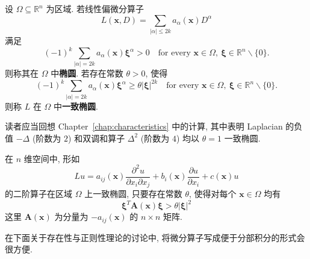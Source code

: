 \begin{Definition}
\label{def:positive-sign-elliptic-and-uniform-elliptic}
设 $\Omega\subseteq\mathbb{R}^n$ 为区域. 若线性偏微分算子
\begin{equation}\label{eq:even-order-elliptic-differential-operator}
L(\bm{x},D)=\sum_{|\alpha|\leq2k}a_\alpha(\bm{x})D^\alpha
\end{equation}
满足
\begin{equation}\label{eq:positive-sign-ellipticity-condition}
(-1)^k\sum_{|\alpha|=2k}a_\alpha(\bm{x})\bm{\xi}^\alpha>0\quad\text{for every }\bm{x}\in\Omega,\ \bm{\xi}\in\mathbb{R}^n\backslash\{0\}.
\end{equation}
则称其在 $\Omega$ 中\textbf{椭圆}. 若存在常数 $\theta>0$, 使得
\begin{equation}\label{eq:uniform-ellipticity-principal-symbol-bound}
(-1)^k\sum_{|\alpha|=2k}a_\alpha(\bm{x})\bm{\xi}^\alpha\geq\theta|\bm{\xi}|^{2k}\quad\text{for every }\bm{x}\in\Omega,\ \bm{\xi}\in\mathbb{R}^n\backslash\{0\}.
\end{equation}
则称 $L$ 在 $\Omega$ 中\textbf{一致椭圆}.
\end{Definition}

\begin{Example}
\label{ex:laplacian-biharmonic-uniform-ellipticity}
读者应当回想 Chapter~\ref{chap:characteristics} 中的计算, 其中表明 Laplacian 的负值 $-\Delta$ (阶数为 $2$) 和双调和算子 $\Delta^2$ (阶数为 $4$) 均以 $\theta=1$ 一致椭圆.
\end{Example}

\begin{Example}
\label{ex:second-order-negative-matrix-uniform-ellipticity}
在 $n$ 维空间中, 形如
\begin{equation}\label{eq:second-order-elliptic-nondivergence-operator}
Lu=a_{ij}(\bm{x})\frac{\partial^2u}{\partial x_i\partial x_j}+b_i(\bm{x})\frac{\partial u}{\partial x_i}+c(\bm{x})u
\end{equation}
的二阶算子在区域 $\Omega$ 上一致椭圆, 只要存在常数 $\theta$, 使得对每个 $\bm{x}\in\Omega$ 均有
\begin{equation}\label{eq:second-order-ellipticity-negative-coefficient-matrix}
\bm{\xi}^T\bm{A}(\bm{x})\bm{\xi}>\theta|\bm{\xi}|^2
\end{equation}
这里 $\bm{A}(\bm{x})$ 为分量为 $-a_{ij}(\bm{x})$ 的 $n\times n$ 矩阵.
\end{Example}

在下面关于存在性与正则性理论的讨论中, 将微分算子写成便于分部积分的形式会很方便.

